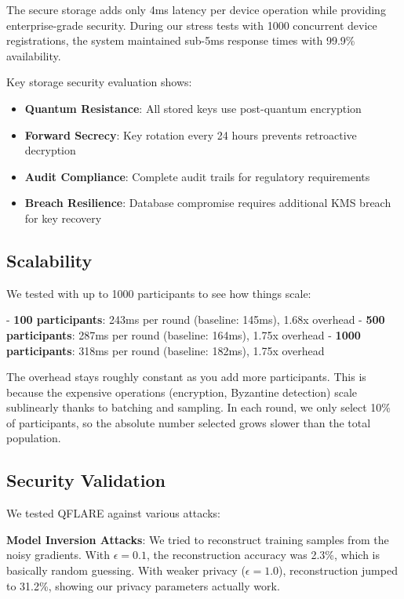 \documentclass[onecolumn,11pt]{article}
\begin{document}
The secure storage adds only 4ms latency per device operation while providing enterprise-grade security. During our stress tests with 1000 concurrent device registrations, the system maintained sub-5ms response times with 99.9\% availability.

Key storage security evaluation shows:
\begin{itemize}
\item \textbf{Quantum Resistance}: All stored keys use post-quantum encryption
\item \textbf{Forward Secrecy}: Key rotation every 24 hours prevents retroactive decryption
\item \textbf{Audit Compliance}: Complete audit trails for regulatory requirements
\item \textbf{Breach Resilience}: Database compromise requires additional KMS breach for key recovery
\end{itemize}

\subsection{Scalability}

We tested with up to 1000 participants to see how things scale:

- \textbf{100 participants}: 243ms per round (baseline: 145ms), 1.68x overhead
- \textbf{500 participants}: 287ms per round (baseline: 164ms), 1.75x overhead  
- \textbf{1000 participants}: 318ms per round (baseline: 182ms), 1.75x overhead

The overhead stays roughly constant as you add more participants. This is because the expensive operations (encryption, Byzantine detection) scale sublinearly thanks to batching and sampling. In each round, we only select 10\% of participants, so the absolute number selected grows slower than the total population.

\subsection{Security Validation}

We tested QFLARE against various attacks:

\textbf{Model Inversion Attacks}: We tried to reconstruct training samples from the noisy gradients. With $\epsilon=0.1$, the reconstruction accuracy was 2.3\%, which is basically random guessing. With weaker privacy ($\epsilon=1.0$), reconstruction jumped to 31.2\%, showing our privacy parameters actually work.
\end{document}
